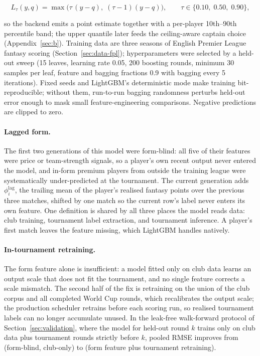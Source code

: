 \begin{equation}
L_{\tau}(y, q) = \max\bigl(\tau\, (y - q),\; (\tau - 1)(y - q)\bigr),
\qquad \tau \in \{0.10,\; 0.50,\; 0.90\},
\label{eq:pinball}
\end{equation}

so the backend emits a point estimate together with a per-player
10th--90th percentile band; the upper quantile later feeds the
ceiling-aware captain choice (Appendix~\ref{sec:b}). Training data
are three seasons of English Premier League fantasy scoring
(Section~\ref{sec:data-fpl}); hyperparameters were selected by a
held-out sweep (15 leaves, learning rate 0.05, 200 boosting rounds,
minimum 30 samples per leaf, feature and bagging fractions 0.9 with
bagging every 5 iterations). Fixed seeds and LightGBM's deterministic
mode make training bit-reproducible; without them, run-to-run bagging
randomness perturbs held-out error enough to mask small
feature-engineering comparisons. Negative predictions are clipped to
zero.

\paragraph{Lagged form.}
The first two generations of this model were form-blind: all five of
their features were price or team-strength signals, so a player's
own recent output never entered the model, and in-form premium
players from outside the training league were systematically
under-predicted at the tournament. The current generation adds
$\phi^{\mathrm{lag}}_i$, the trailing mean of the player's realised
fantasy points over the previous three matches, shifted by one match
so the current row's label never enters its own feature. One
definition is shared by all three places the model reads data: club
training, tournament label extraction, and tournament inference. A
player's first match leaves the feature missing, which LightGBM
handles natively.

\paragraph{In-tournament retraining.}
The form feature alone is insufficient: a model fitted only on club
data learns an output scale that does not fit the tournament, and no
single feature corrects a scale mismatch. The second half of the fix
is retraining on the union of the club corpus and all completed
World Cup rounds, which recalibrates the output scale; the production
scheduler retrains before each scoring run, so realised tournament
labels can no longer accumulate unused. In the leak-free walk-forward
protocol of Section~\ref{sec:validation}, where the model for
held-out round $k$ trains only on club data plus tournament rounds
strictly before $k$, pooled RMSE improves from
\WalkforwardPooledA{} (form-blind, club-only) to
\WalkforwardPooledC{} (form feature plus tournament retraining).

